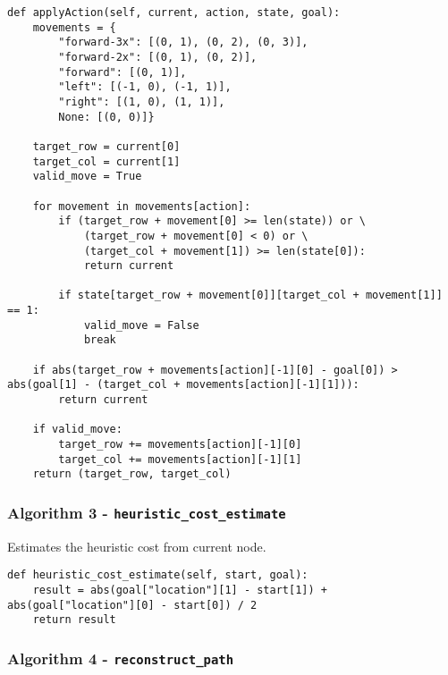 \documentclass[12pt, letterpaper]{article}
\begin{document}
\begin{mdframed}[backgroundcolor=shadecolor]
\begin{verbatim}
def applyAction(self, current, action, state, goal):
    movements = {
        "forward-3x": [(0, 1), (0, 2), (0, 3)], 
        "forward-2x": [(0, 1), (0, 2)], 
        "forward": [(0, 1)], 
        "left": [(-1, 0), (-1, 1)], 
        "right": [(1, 0), (1, 1)], 
        None: [(0, 0)]}
    
    target_row = current[0]
    target_col = current[1]
    valid_move = True
    
    for movement in movements[action]:
        if (target_row + movement[0] >= len(state)) or \
            (target_row + movement[0] < 0) or \
            (target_col + movement[1]) >= len(state[0]):
            return current
                
        if state[target_row + movement[0]][target_col + movement[1]] == 1:
            valid_move = False
            break
        
    if abs(target_row + movements[action][-1][0] - goal[0]) > abs(goal[1] - (target_col + movements[action][-1][1])):
        return current
    
    if valid_move:
        target_row += movements[action][-1][0]
        target_col += movements[action][-1][1]
    return (target_row, target_col)
\end{verbatim}
\end{mdframed}

\subsubsection{Algorithm 3 - \texttt{heuristic\_cost\_estimate}}

Estimates the heuristic cost from current node.

\begin{mdframed}[backgroundcolor=shadecolor]
\begin{verbatim}
def heuristic_cost_estimate(self, start, goal):
    result = abs(goal["location"][1] - start[1]) + abs(goal["location"][0] - start[0]) / 2
    return result
\end{verbatim}
\end{mdframed}

\subsubsection{Algorithm 4 - \texttt{reconstruct\_path}}
\end{document}
